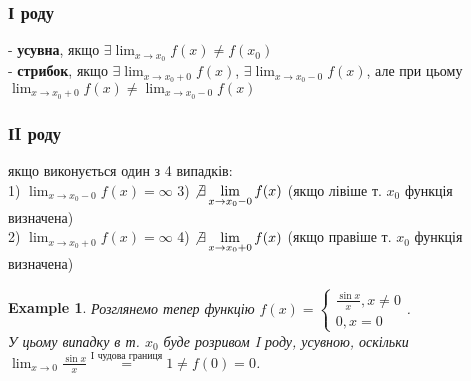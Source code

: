 \documentclass[a4paper, 14pt]{article}
\theoremstyle{theoremdd}
\theoremstyle{theoremdd}
\theoremstyle{theoremdd}
\theoremstyle{theoremdd}
\newtheorem{example}[theorem]{Example}
\theoremstyle{theoremdd}
\theoremstyle{theoremdd}
\theoremstyle{theoremdd}
\theoremstyle{theoremdd}
\begin{document}
\subsubsection*{І роду}
- \textbf{усувна}, якщо $\exists \displaystyle \lim_{x \to x_0} f(x) \neq f(x_0)$\\
- \textbf{стрибок}, якщо $\exists \displaystyle \lim_{x \to x_0+0} f(x)$, $\exists \displaystyle \lim_{x \to x_0-0} f(x)$, але при цьому $\displaystyle \lim_{x \to x_0+0} f(x) \neq \lim_{x \to x_0-0} f(x)$

\subsubsection*{ІI роду}
якщо виконується один з 4 випадків:\\
1) $\displaystyle \lim_{x \to x_0-0} f(x) = \infty$ \hspace{3cm} 3) $\displaystyle \not\exists \lim_{x \to x_0-0} f(x)$ (якщо лівіше т. $x_0$ функція визначена)\\
2) $\displaystyle \lim_{x \to x_0+0} f(x) = \infty$ \hspace{3cm} 4) $\displaystyle \not\exists \lim_{x \to x_0+0} f(x)$ (якщо правіше т. $x_0$ функція визначена)

\begin{example}
Розглянемо тепер функцію $f(x) = \begin{cases} \displaystyle \frac{\sin x}{x}, x \neq 0 \\ 0, x = 0 \end{cases}$.\\
У цьому випадку в т. $x_0$ буде розривом I роду, усувною, оскільки\\
$\displaystyle \lim_{x \to 0} \frac{\sin x}{x} \overset{\textrm{I чудова границя}}{=} 1 \neq f(0) = 0$.\\
\begin{figure} [H]
\centering
\resizebox{1\textwidth}{!}
{
}
\end{figure}
\end{example}
\end{document}
